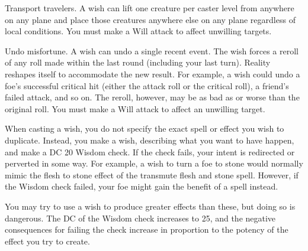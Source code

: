 \begin{spelleffect}
\begin{itemize*}
        \item Transport travelers. A wish can lift one creature per caster level from anywhere on any plane and place those creatures anywhere else on any plane regardless of local conditions. You must make a Will attack to affect unwilling targets.
        \item Undo misfortune. A wish can undo a single recent event. The wish forces a reroll of any roll made within the last round (including your last turn). Reality reshapes itself to accommodate the new result. For example, a wish could undo a foe's successful critical hit (either the attack roll or the critical roll), a friend's failed attack, and so on. The reroll, however, may be as bad as or worse than the original roll. You must make a Will attack to affect an unwilling target.
    \end{itemize*}
    \par When casting a wish, you do not specify the exact spell or effect you wish to duplicate. Instead, you make a wish, describing what you want to have happen, and make a DC 20 Wisdom check. If the check fails, your intent is redirected or perverted in some way. For example, a wish to turn a foe to stone would normally mimic the flesh to stone effect of the transmute flesh and stone spell. However, if the Wisdom check failed, your foe might gain the benefit of a  spell instead.
    \par You may try to use a wish to produce greater effects than these, but doing so is dangerous. The DC of the Wisdom check increases to 25, and the negative consequences for failing the check increase in proportion to the potency of the effect you try to create.
\end{spelleffect}


